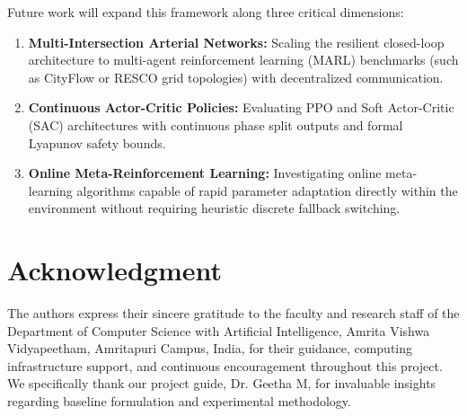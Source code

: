 \documentclass{ieeeaccess}
\begin{document}
Future work will expand this framework along three critical dimensions:
\begin{enumerate}
    \item \textbf{Multi-Intersection Arterial Networks:} Scaling the resilient closed-loop architecture to multi-agent reinforcement learning (MARL) benchmarks (such as CityFlow or RESCO grid topologies) with decentralized communication.
    \item \textbf{Continuous Actor-Critic Policies:} Evaluating PPO and Soft Actor-Critic (SAC) architectures with continuous phase split outputs and formal Lyapunov safety bounds.
    \item \textbf{Online Meta-Reinforcement Learning:} Investigating online meta-learning algorithms capable of rapid parameter adaptation directly within the environment without requiring heuristic discrete fallback switching.
\end{enumerate}

\section*{Acknowledgment}
The authors express their sincere gratitude to the faculty and research staff of the Department of Computer Science with Artificial Intelligence, Amrita Vishwa Vidyapeetham, Amritapuri Campus, India, for their guidance, computing infrastructure support, and continuous encouragement throughout this project. We specifically thank our project guide, Dr. Geetha M, for invaluable insights regarding baseline formulation and experimental methodology.




\EOD
\end{document}
